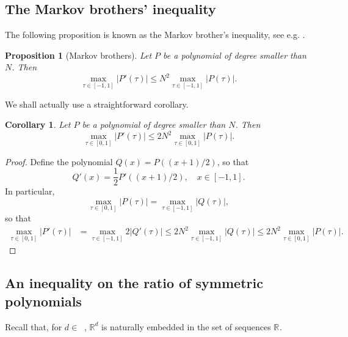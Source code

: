 \documentclass[twoside,11pt]{book}
\newtheorem{corollary}{Corollary}
\newtheorem{proposition}{Proposition}
\numberwithin{theorem}{chapter}
\numberwithin{definition}{chapter}
\numberwithin{proposition}{chapter}
\numberwithin{corollary}{chapter}
\numberwithin{example}{chapter}
\numberwithin{lemma}{chapter}
\numberwithin{assumption}{chapter}
\numberwithin{equation}{chapter}
\numberwithin{figure}{chapter}
\DeclareMathOperator{\Ns}{\mathbb{N}^{*}}
\begin{document}
\subsection{The Markov brothers' inequality}
The following proposition is known as the Markov brother's inequality, see e.g. \citep{Sha04}.
\begin{proposition}[Markov brothers]\label{CVS_thm:Markov_Brothers_inequality}
Let $P$ be a polynomial of degree smaller than $N$. Then
\begin{equation}
\max_{\tau \in [-1,1]} |P'(\tau)| \leq N^{2}\max_{\tau \in [-1,1]}|P(\tau)|.
\end{equation}
\end{proposition}
We shall actually use a straightforward corollary.
\begin{corollary}\label{CVS_cor:Markov_Brothers_inequality_2}
Let $P$ be a polynomial of degree smaller than $N$. Then
\begin{equation}
\max_{\tau \in [0,1]} |P'(\tau)| \leq 2N^{2}\max_{\tau \in [0,1]}|P(\tau)|.
\end{equation}
\end{corollary}
\begin{proof}
Define the polynomial $Q(x) = P((x+1)/2)$, so that
\begin{equation}
Q'(x) = \frac{1}{2}P'((x+1)/2), \quad x\in[-1,1].
\end{equation}
In particular,
$$\max_{\tau \in [0,1]} |P(\tau)| = \max_{\tau \in [-1,1]} |Q(\tau)|,$$
so that
%
\begin{align}
\max_{\tau \in [0,1]} |P'(\tau)| & = \max_{\tau \in [-1,1]} 2|Q'(\tau)| \leq 2N^2\max_{\tau \in [-1,1]} |Q(\tau)| \leq 2N^2\max_{\tau \in [0,1]} |P(\tau)|.
\end{align}
\end{proof}
\subsection{An inequality on the ratio of symmetric polynomials}
\label{CVS_s:inequality_symmetric_polys}
Recall that, for $d \in \Ns$, $\mathbb{R}^{d}$ is naturally embedded in the set of sequences $\mathbb{R}^{\Ns}$.
\end{document}
